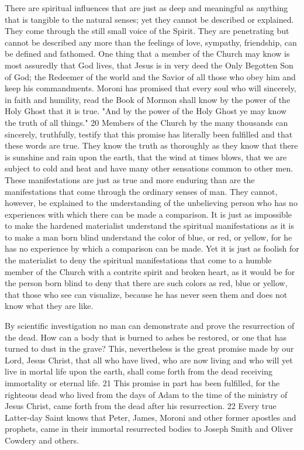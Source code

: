 There are spiritual influences that are just as deep and meaningful as anything that is tangible
to the natural senses; yet they cannot be described or explained. They come through the still
small voice of the Spirit. They are penetrating but cannot be described any more than the
feelings of love, sympathy, friendship, can be defined and fathomed. One thing that a
member of the Church may know is most assuredly that God lives, that Jesus is in very deed
the Only Begotten Son of God; the Redeemer of the world and the Savior of all those who
obey him and keep his commandments. Moroni has promised that every soul who will
sincerely, in faith and humility, read the Book of Mormon shall know by the power of the
Holy Ghost that it is true. "And by the power of the Holy Ghost ye may know the truth of all
things." 20 Members of the Church by the many thousands can sincerely, truthfully, testify
that this promise has literally been fulfilled and that these words are true. They know the
truth as thoroughly as they know that there is sunshine and rain upon the earth, that the wind
at times blows, that we are subject to cold and heat and have many other sensations common
to other men. These manifestations are just as true and more enduring than are the
manifestations that come through the ordinary senses of man. They cannot, however, be
explained to the understanding of the unbelieving person who has no experiences with which
there can be made a comparison. It is just as impossible to make the hardened materialist
understand the spiritual manifestations as it is to make a man born blind understand the color
of blue, or red, or yellow, for he has no experience by which a comparison can be made. Yet
it is just as foolish for the materialist to deny the spiritual manifestations that come to a
humble member of the Church with a contrite spirit and broken heart, as it would be for the
person born blind to deny that there are such colors as red, blue or yellow, that those who see
can visualize, because he has never seen them and does not know what they are like.

By scientific investigation no man can demonstrate and prove the resurrection of the dead.
How can a body that is burned to ashes be restored, or one that has turned to dust in the
grave? This, nevertheless is the great promise made by our Lord, Jesus Christ, that all who
have lived, who are now living and who will yet live in mortal life upon the earth, shall come
forth from the dead receiving immortality or eternal life. 21 This promise in part has been
fulfilled, for the righteous dead who lived from the days of Adam to the time of the ministry
of Jesus Christ, came forth from the dead after his resurrection. 22 Every true Latter-day
Saint knows that Peter, James, Moroni and other former apostles and prophets, came in their
immortal resurrected bodies to Joseph Smith and Oliver Cowdery and others.

